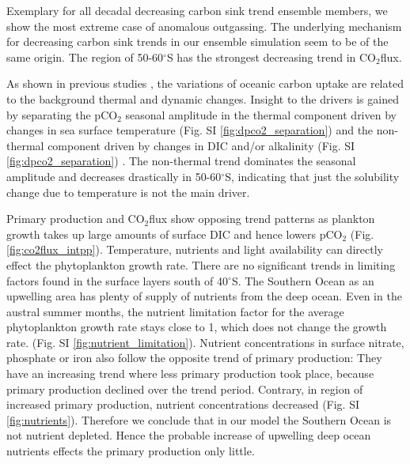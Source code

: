 \documentclass[12pt]{article}
\begin{document}
Exemplary for all decadal decreasing carbon sink trend ensemble members, we show the most extreme case of anomalous outgassing. The underlying mechanism for decreasing carbon sink trends in our ensemble simulation seem to be of the same origin. The region of 50-60$^\circ$S has the strongest decreasing trend in CO$_2$flux.

As shown in previous studies \citep{LeQuere2007}, the variations of oceanic carbon uptake are related to the background thermal and dynamic changes. Insight to the drivers is gained by separating the pCO$_2$ seasonal amplitude in the thermal component driven by changes in sea surface temperature (Fig. SI \ref{fig:dpco2_separation}) and the non-thermal component driven by changes in DIC and/or alkalinity (Fig. SI \ref{fig:dpco2_separation}) \citep{Takahashi2002}. The non-thermal trend dominates the seasonal amplitude and decreases drastically in 50-60$^\circ$S, indicating that just the solubility change due to temperature is not the main driver.

Primary production and CO$_2$flux show opposing trend patterns as plankton growth takes up large amounts of surface DIC and hence lowers pCO$_2$ (Fig. \ref{fig:co2flux_intpp}). 
Temperature, nutrients and light availability can directly effect the phytoplankton growth rate. There are no significant trends in limiting factors found in the surface layers south of 40$^\circ$S. The Southern Ocean as an upwelling area has plenty of supply of nutrients from the deep ocean. Even in the austral summer months, the nutrient limitation factor for the average phytoplankton growth rate stays close to 1, which does not change the growth rate. (Fig. SI \ref{fig:nutrient_limitation}). Nutrient concentrations in surface nitrate, phosphate or iron also follow the opposite trend of primary production: They have an increasing trend where less primary production took place, because primary production declined over the trend period. Contrary, in region of increased primary production, nutrient concentrations decreased (Fig. SI \ref{fig:nutrients}). Therefore we conclude that in our model the Southern Ocean is not nutrient depleted. Hence the probable increase of upwelling deep ocean nutrients effects the primary production only little.

\end{document}
